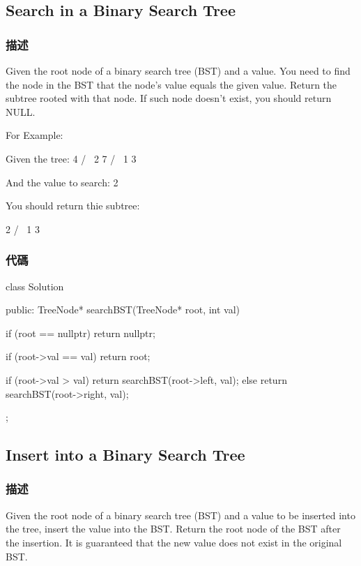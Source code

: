 \subsection{Search in a Binary Search Tree}
\label{sec:search-in-a-binary-search-tree}

\subsubsection{描述}
Given the root node of a binary search tree (BST) and a value. You need to find the node in the BST that the node's value equals the given value. Return the subtree rooted with that node. If such node doesn't exist, you should return NULL.

For Example:
\begin{Code}
Given the tree:
        4
       / \
      2   7
     / \
    1   3

And the value to search: 2
\end{Code}

You should return thie subtree:
\begin{Code}
      2     
     / \   
    1   3
\end{Code}


\subsubsection{代碼}
\begin{Code}
class Solution {
public:
    TreeNode* searchBST(TreeNode* root, int val) {
        if (root == nullptr) return nullptr;

        if (root->val == val) return root;

        if (root->val > val)
            return searchBST(root->left, val);
        else
            return searchBST(root->right, val);
    }
};
\end{Code}

\subsection{Insert into a Binary Search Tree}
\label{sec:insert-into-a-binary-search-tree}

\subsubsection{描述}
Given the root node of a binary search tree (BST) and a value to be inserted into the tree, insert the value into the BST. Return the root node of the BST after the insertion. It is guaranteed that the new value does not exist in the original BST.

